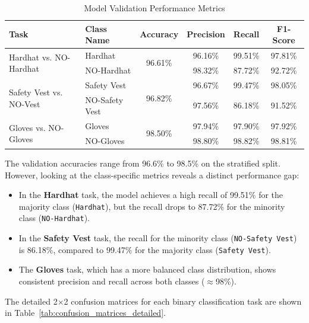 \documentclass[11pt,a4paper]{article}
\begin{document}
\begin{table}[H]
\centering
\caption{Model Validation Performance Metrics}
\label{tab:validation_results_detailed}
\begin{tabular}{@{}llcccc@{}}
\toprule
\textbf{Task}                         & \textbf{Class Name}    & \textbf{Accuracy} & \textbf{Precision} & \textbf{Recall} & \textbf{F1-Score} \\ \midrule
\multirow{2}{*}{Hardhat vs. NO-Hardhat}   & Hardhat            & \multirow{2}{*}{96.61\%} & 96.16\% & 99.51\% & 97.81\% \\
                                & NO-Hardhat         &                          & 98.32\% & 87.72\% & 92.72\% \\ \midrule
\multirow{2}{*}{Safety Vest vs. NO-Vest}  & Safety Vest        & \multirow{2}{*}{96.82\%} & 96.67\% & 99.47\% & 98.05\% \\
                                & NO-Safety Vest     &                          & 97.56\% & 86.18\% & 91.52\% \\ \midrule
\multirow{2}{*}{Gloves vs. NO-Gloves}     & Gloves             & \multirow{2}{*}{98.50\%} & 97.94\% & 97.90\% & 97.92\% \\
                                & NO-Gloves          &                          & 98.80\% & 98.82\% & 98.81\% \\ \bottomrule
\end{tabular}
\end{table}

The validation accuracies range from 96.6\% to 98.5\% on the stratified split. However, looking at the class-specific metrics reveals a distinct performance gap:
\begin{itemize}
\item In the \textbf{Hardhat} task, the model achieves a high recall of 99.51\% for the majority class (\texttt{Hardhat}), but the recall drops to 87.72\% for the minority class (\texttt{NO-Hardhat}).
\item In the \textbf{Safety Vest} task, the recall for the minority class (\texttt{NO-Safety Vest}) is 86.18\%, compared to 99.47\% for the majority class (\texttt{Safety Vest}).
\item The \textbf{Gloves} task, which has a more balanced class distribution, shows consistent precision and recall across both classes ($\approx$98\%).
\end{itemize}

The detailed 2$\times$2 confusion matrices for each binary classification task are shown in Table~\ref{tab:confusion_matrices_detailed}.
\end{document}

